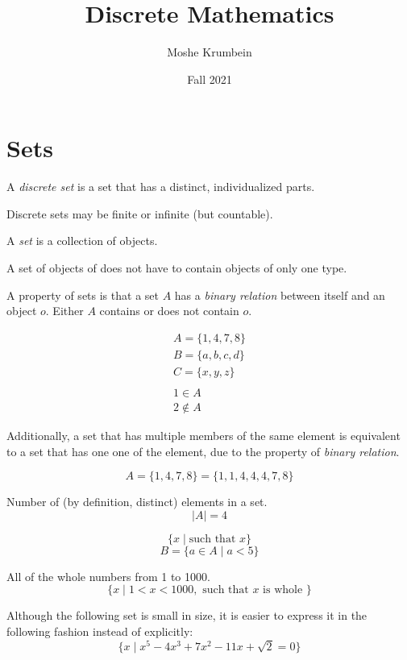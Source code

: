 \documentclass[00_complete]{subfiles}
\title{Discrete Mathematics}
\author{Moshe Krumbein}
\date{Fall 2021}
\begin{document}

\section{Sets}
\begin{definition}
A \emph{discrete set} is a set that has a distinct, individualized parts.

Discrete sets may be finite or infinite (but countable).
\end{definition}

\begin{definition}[Sets]
A \emph{set} is a collection of objects.

A set of objects of does not have to contain objects of only one type.

A property of sets is that a set $A$ has a \emph{binary relation} between
itself and an object $o$. Either $A$ contains or does not contain $o$.
\end{definition}

\begin{example}
\begin{gather*}
    A=\{1,4,7,8\} \\
    B=\{a,b,c,d\} \\
    C=\{x,y,z\} \\
    \\
    1 \in A \\
    2 \notin A
\end{gather*}
\end{example}

Additionally, a set that has multiple members of the same element is
equivalent to a set that has one one of the element, due to the property of
\emph{binary relation}.

$$A = \{1,4,7,8\} = \{1,1,4,4,4,7,8\}$$

\begin{definition}
    Number of (by definition, distinct) elements in a set.
    $$|A| = 4$$
\end{definition}

\begin{definition}
$$\{ x \;|\; \text{such that } x \}$$
$$B = \{a \in A \;|\; a < 5 \}$$
\begin{example}
All of the whole numbers from 1 to 1000.
$$\{x \;|\; 1<x<1000, \text{ such that $x$ is whole }\}$$
\end{example}

Although the following set is small in size, it is easier to express it in
the following fashion instead of explicitly:
$$\{x \;|\; x^5-4x^3+7x^2-11x+\sqrt 2=0\}$$
\end{definition}
\end{document}
